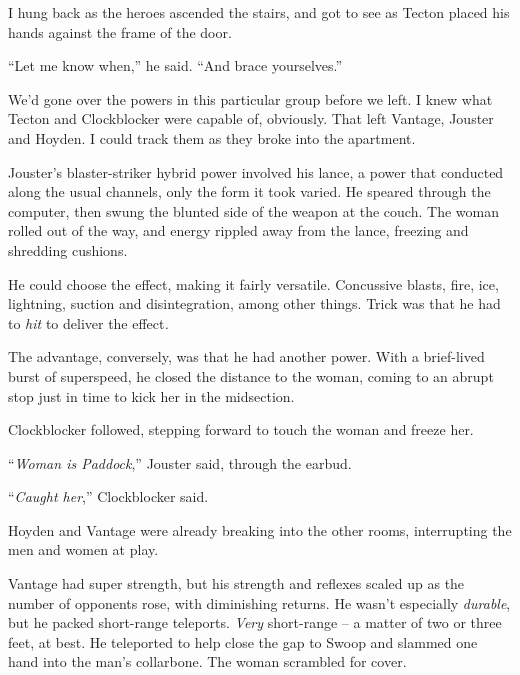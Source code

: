 I hung back as the heroes ascended the stairs, and got to see as Tecton placed his hands against the frame of the door.



``Let me know when,'' he said.  ``And brace yourselves.''



We'd gone over the powers in this particular group before we left.  I knew what Tecton and Clockblocker were capable of, obviously.  That left Vantage, Jouster and Hoyden.  I could track them as they broke into the apartment.



Jouster's blaster-striker hybrid power involved his lance, a power that conducted along the usual channels, only the form it took varied.  He speared through the computer, then swung the blunted side of the weapon at the couch.  The woman rolled out of the way, and energy rippled away from the lance, freezing and shredding cushions.



He could choose the effect, making it fairly versatile.  Concussive blasts, fire, ice, lightning, suction and disintegration, among other things.  Trick was that he had to \emph{hit }to deliver the effect\emph{.}



The advantage, conversely, was that he had another power.  With a brief-lived burst of superspeed, he closed the distance to the woman, coming to an abrupt stop just in time to kick her in the midsection.



Clockblocker followed, stepping forward to touch the woman and freeze her.



``\emph{Woman is Paddock},'' Jouster said, through the earbud.



``\emph{Caught her},'' Clockblocker said.



Hoyden and Vantage were already breaking into the other rooms, interrupting the men and women at play.



Vantage had super strength, but his strength and reflexes scaled up as the number of opponents rose, with diminishing returns.  He wasn't especially \emph{durable}, but he packed short-range teleports.  \emph{Very} short-range – a matter of two or three feet, at best.  He teleported to help close the gap to Swoop and slammed one hand into the man's collarbone.  The woman scrambled for cover.



